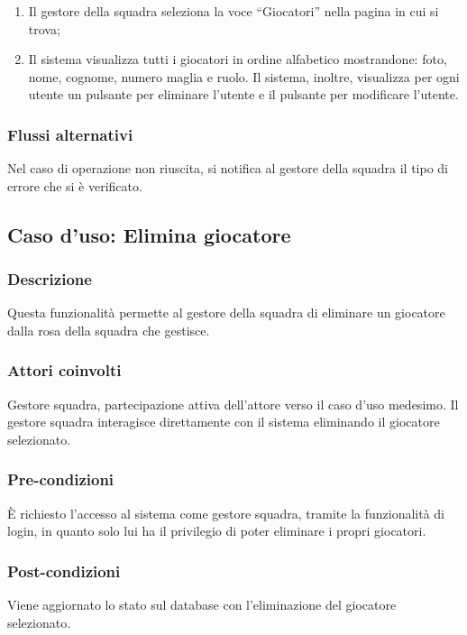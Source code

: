 \begin{enumerate}
	
	\item
	Il gestore della squadra seleziona la voce ``Giocatori'' nella pagina in cui si trova;
	
	\item
	Il sistema visualizza tutti i giocatori in ordine alfabetico mostrandone: foto, nome, cognome, numero maglia e ruolo. Il sistema, inoltre, visualizza per ogni utente un pulsante per eliminare l'utente e il pulsante per modificare l'utente.
	
\end{enumerate}

\subsubsection*{Flussi alternativi}
Nel caso di operazione non riuscita, si notifica al gestore della squadra il tipo di errore che si è verificato.


%
%
\subsection{Caso d'uso: Elimina giocatore}

\subsubsection*{Descrizione}
Questa funzionalità permette al gestore della squadra di eliminare un giocatore dalla rosa della squadra che gestisce.

\subsubsection*{Attori coinvolti}
Gestore squadra, partecipazione attiva dell'attore verso il caso d'uso medesimo.
Il gestore squadra interagisce direttamente con il sistema eliminando il giocatore selezionato.

\subsubsection*{Pre-condizioni}
È richiesto l'accesso al sistema come gestore squadra, tramite la funzionalità di login, in quanto solo lui ha il privilegio di poter eliminare i propri giocatori.

\subsubsection*{Post-condizioni}
Viene aggiornato lo stato sul database con l'eliminazione del giocatore selezionato.

